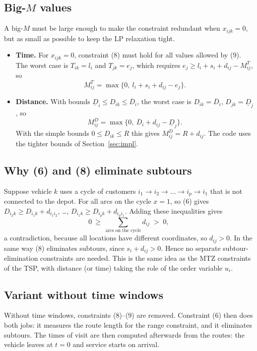 \documentclass[11pt,a4paper]{article}
\theoremstyle{definition}
\begin{document}
\subsection{Big-$M$ values}\label{sec:bigm}
A big-$M$ must be large enough to make the constraint redundant when $x_{ijk}=0$, but as small as possible to keep the LP relaxation tight.
\begin{itemize}
\item \textbf{Time.} For $x_{ijk}=0$, constraint (8) must hold for all values allowed by (9). The worst case is $T_{ik}=l_i$ and $T_{jk}=e_j$, which requires $e_j\ge l_i+s_i+d_{ij}-M^T_{ij}$, so
\[ M^T_{ij}=\max\{0,\ l_i+s_i+d_{ij}-e_j\}. \]
\item \textbf{Distance.} With bounds $\underline D_i\le D_{ik}\le\overline D_i$, the worst case is $D_{ik}=\overline D_i$, $D_{jk}=\underline D_j$, so
\[ M^D_{ij}=\max\{0,\ \overline D_i+d_{ij}-\underline D_j\}. \]
With the simple bounds $0\le D_{ik}\le R$ this gives $M^D_{ij}=R+d_{ij}$. The code uses the tighter bounds of Section~\ref{sec:impl}.
\end{itemize}

\subsection{Why (6) and (8) eliminate subtours}\label{sec:subtour}
Suppose vehicle $k$ uses a cycle of customers $i_1\to i_2\to\dots\to i_p\to i_1$ that is not connected to the depot. For all arcs on the cycle $x=1$, so (6) gives $D_{i_2k}\ge D_{i_1k}+d_{i_1i_2}$, \dots, $D_{i_1k}\ge D_{i_pk}+d_{i_pi_1}$. Adding these inequalities gives
\[ 0\ \ge\ \textstyle\sum_{\text{arcs on the cycle}} d_{ij} \;>\;0, \]
a contradiction, because all locations have different coordinates, so $d_{ij}>0$. In the same way (8) eliminates subtours, since $s_i+d_{ij}>0$. Hence no separate subtour-elimination constraints are needed. This is the same idea as the MTZ constraints of the TSP, with distance (or time) taking the role of the order variable $u_i$.

\subsection{Variant without time windows}
Without time windows, constraints (8)--(9) are removed. Constraint (6) then does both jobs: it measures the route length for the range constraint, and it eliminates subtours. The times of visit are then computed afterwards from the routes: the vehicle leaves at $t=0$ and service starts on arrival.
\end{document}

